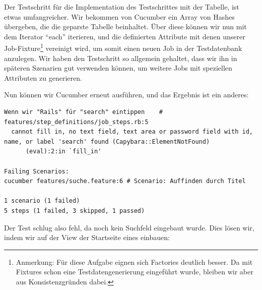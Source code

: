 Der Testschritt für die Implementation des Testschrittes mit der Tabelle, ist etwas umfangreicher. Wir bekommen von Cucumber ein Array von Hashes übergeben, die die geparste Tabelle beinhaltet. Über diese können wir nun mit dem Iterator "`each"' iterieren, und die definierten Attribute mit denen unserer Job-Fixture\footnote{Anmerkung: Für diese Aufgabe eignen sich Factories deutlich besser. Da mit Fixtures schon eine Testdatengenerierung eingeführt wurde, bleiben wir aber aus Konsistenzgründen dabei.} vereinigt wird, um somit einen neuen Job in der Testdatenbank anzulegen. Wir haben den Testschritt so allgemein gehaltet, dass wir ihn in späteren Szenarien gut verwenden können, um weitere Jobs mit speziellen Attributen zu generieren.

Nun können wir Cucumber erneut ausführen, und das Ergebnis ist ein anderes:

\begin{lstlisting}
Wenn wir "Rails" für "search" eintippen    # features/step_definitions/job_steps.rb:5
  cannot fill in, no text field, text area or password field with id, name, or label 'search' found (Capybara::ElementNotFound)
      (eval):2:in `fill_in'

Failing Scenarios:
cucumber features/suche.feature:6 # Scenario: Auffinden durch Titel

1 scenario (1 failed)
5 steps (1 failed, 3 skipped, 1 passed)
\end{lstlisting}


\tddred
Der Test schlug also fehl, da noch kein Suchfeld eingebaut wurde. 
Dies lösen wir, indem wir auf der View der Startseite eines einbauen:

